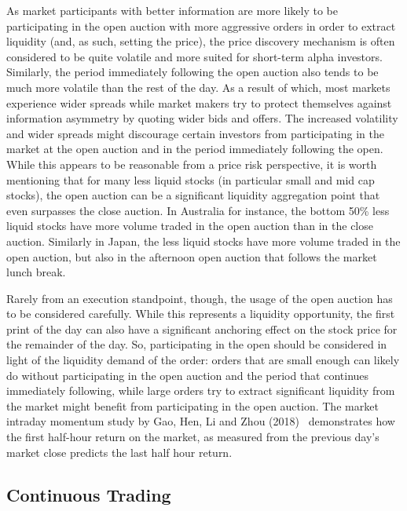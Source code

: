 As market participants with better information are more likely to be participating in the open auction with more aggressive orders in order to extract liquidity (and, as such, setting the price), the price discovery mechanism is often considered to be quite volatile and more suited for short-term alpha investors. Similarly, the period immediately following the open auction also tends to be much more volatile than the rest of the day. As a result of which, most markets experience wider spreads while market makers try to protect themselves against information asymmetry by quoting wider bids and offers. The increased volatility and wider spreads might discourage certain investors from participating in the market at the open auction and in the period immediately following the open. While this appears to be reasonable from a price risk perspective, it is worth mentioning that for many less liquid stocks (in particular small and mid cap stocks), the open auction can be a significant liquidity aggregation point that even surpasses the close auction. In Australia for instance, the bottom 50\% less liquid stocks have more volume traded in the open auction than in the close auction. Similarly in Japan, the less liquid stocks have more volume traded in the open auction, but also in the afternoon open auction that follows the market lunch break. \twomedskip


Rarely from an execution standpoint, though, the usage of the open auction has to be considered carefully. While this represents a liquidity opportunity, the first print of the day can also have a significant anchoring effect on the stock price for the remainder of the day. So, participating in the open should be considered in light of the liquidity demand of the order: orders that are small enough can likely do without participating in the open auction and the period that continues immediately following, while large orders try to extract significant liquidity from the market might benefit from participating in the open auction. The market intraday momentum study by Gao, Hen, Li and Zhou (2018)~\cite{ghliz} demonstrates how the first half-hour return on the market, as measured from the previous day's market close predicts the last half hour return.



\subsection{Continuous Trading} 


